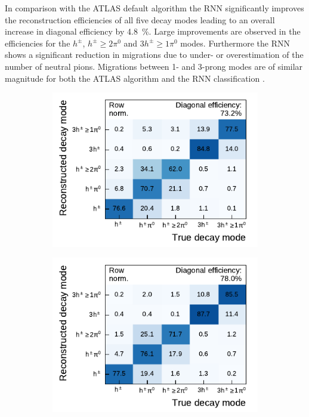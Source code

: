 In comparison with the ATLAS default algorithm the RNN significantly improves
the reconstruction efficiencies of all five decay modes leading to an overall
increase in diagonal efficiency by \SI{4.8}{\percent}. Large improvements are
observed in the efficiencies for the $h^\pm$, $h^\pm \geq 2\pi^0$ and
$3h^\pm \geq 1\pi^0$ modes. Furthermore the RNN shows a significant reduction in
migrations due to under- or overestimation of the number of neutral pions.
Migrations between 1- and 3-prong modes are of similar magnitude for both the
ATLAS algorithm and the RNN classification .

\begin{figure}[htb]
  \begin{subfigure}[t]{0.48\textwidth}
    \centering
    \includegraphics{./figures/decay_mode_classification/comp_mat_pantau.pdf}
  \end{subfigure}\hfill
  \begin{subfigure}[t]{0.48\textwidth}
    \centering
    \includegraphics{./figures/decay_mode_classification/comp_mat_baseline_ptcut_1_5.pdf}

\end{subfigure}
\end{figure}
